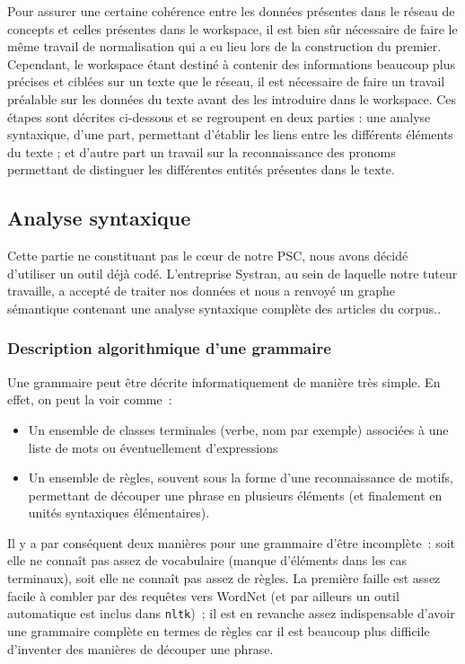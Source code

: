 \documentclass[a4paper, 12pt]{article}
\newcommand{\pyt}[1]{\texttt{#1}}%
\begin{document}
Pour assurer une certaine cohérence entre les données présentes dans le réseau de concepts et celles présentes dans le workspace, il est bien sûr nécessaire de faire le même travail de normalisation qui a eu lieu lors de la construction du premier. Cependant, le workspace étant destiné à contenir des informations beaucoup plus précises et ciblées sur un texte que le réseau, il est nécessaire de faire un travail préalable sur les données du texte avant des les introduire dans le workspace. Ces étapes sont décrites ci-dessous et se regroupent en deux parties : une analyse syntaxique, d'une part, permettant d'établir les liens entre les différents éléments du texte ; et d'autre part un travail sur la reconnaissance des pronoms permettant de distinguer les différentes entités présentes dans le texte.

\subsection{Analyse syntaxique}

Cette partie ne constituant pas le c\oe{}ur de notre PSC, nous avons décidé d'utiliser un outil déjà codé. L'entreprise Systran, au sein de laquelle notre tuteur travaille, a accepté de traiter nos données et nous a renvoyé un graphe sémantique contenant une analyse syntaxique complète des articles du corpus..

\subsubsection{Description algorithmique d'une grammaire}
Une grammaire peut être décrite informatiquement de manière très simple. En effet, on peut la voir comme~:
\begin{itemize}
	\item Un ensemble de classes terminales (verbe, nom par exemple) associées à une liste de mots ou éventuellement d'expressions
	\item Un ensemble de règles, souvent sous la forme d'une reconnaissance de motifs, permettant de découper une phrase en plusieurs éléments (et finalement en unités syntaxiques élémentaires).
\end{itemize}

Il y a par conséquent deux manières pour une grammaire d'être incomplète~: soit elle ne connaît pas assez de vocabulaire (manque d'éléments dans les cas terminaux), soit elle ne connaît pas assez de règles. La première faille est assez facile à combler par des requêtes vers WordNet (et par ailleurs un outil automatique est inclus dans \pyt{nltk})~; il est en revanche assez indispensable d'avoir une grammaire complète en termes de règles car il est beaucoup plus difficile d'inventer des manières de découper une phrase.
\end{document}
